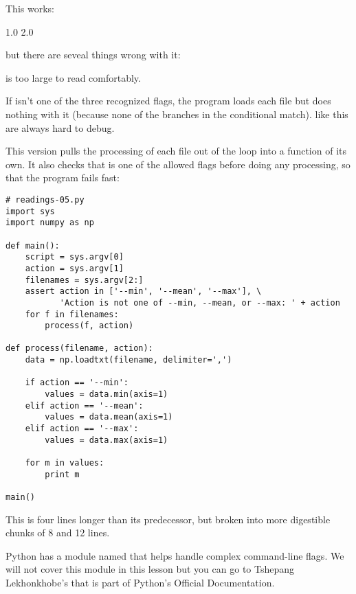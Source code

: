 This works:


\begin{VerbOut}
1.0
2.0
\end{VerbOut}

but there are seveal things wrong with it:

\begin{swcenumerate}
\item
   is too large to read comfortably.
\item
  If  isn't one of the three recognized flags, the
  program loads each file but does nothing with it (because none of the
  branches in the conditional match).  like this are always hard to debug.
\end{swcenumerate}

This version pulls the processing of each file out of the loop into a
function of its own. It also checks that  is one of the
allowed flags before doing any processing, so that the program fails
fast:

\begin{Verbatim}
# readings-05.py
import sys
import numpy as np

def main():
    script = sys.argv[0]
    action = sys.argv[1]
    filenames = sys.argv[2:]
    assert action in ['--min', '--mean', '--max'], \
           'Action is not one of --min, --mean, or --max: ' + action
    for f in filenames:
        process(f, action)

def process(filename, action):
    data = np.loadtxt(filename, delimiter=',')

    if action == '--min':
        values = data.min(axis=1)
    elif action == '--mean':
        values = data.mean(axis=1)
    elif action == '--max':
        values = data.max(axis=1)

    for m in values:
        print m

main()
\end{Verbatim}

This is four lines longer than its predecessor, but broken into more
digestible chunks of 8 and 12 lines.

Python has a module named
 that
helps handle complex command-line flags. We will not cover this module
in this lesson but you can go to Tshepang Lekhonkhobe's
that is part of Python's Official Documentation.

